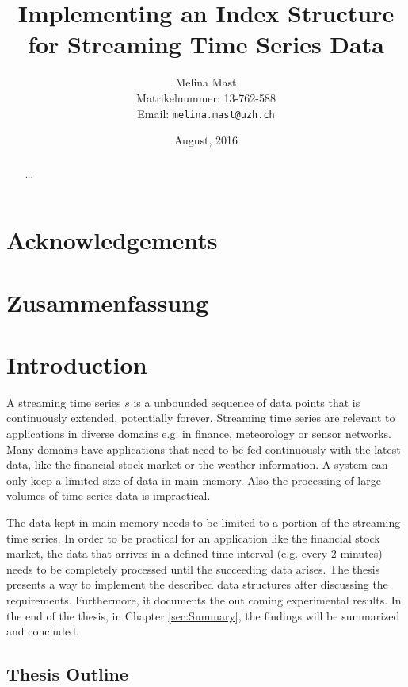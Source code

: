 \documentclass[abstracton,12pt]{scrreprt}
\title{Implementing an Index Structure for Streaming Time Series Data}
\author{
  Melina Mast\\[-5pt]
  \scriptsize Matrikelnummer: 13-762-588\\[-5pt]
  \scriptsize Email: \texttt{melina.mast@uzh.ch}
}
\date{\vspace*{2cm}August, 2016}
\begin{document}
\maketitle

\chapter*{Acknowledgements}



\begin{abstract}
  ...
\end{abstract}

\chapter*{Zusammenfassung}

\tableofcontents
\listoffigures
\listoftables
\listofalgorithms
\renewcommand{\lstlistingname}{Algorithm}%



\chapter{Introduction}
A streaming time series $s$ is a unbounded sequence of data points that is continuously extended, potentially forever. Streaming time series are relevant to applications in diverse domains e.g. in finance, meteorology or sensor networks. Many domains have applications that need to be fed continuously with the latest data, like the financial stock market or the weather information. A system can only keep a limited size of data in main memory. Also the processing of large volumes of time series data is impractical.

The data kept in main memory needs to be limited to a portion of the streaming time series. In order to be practical for an application like the financial stock market, the data that arrives in a defined time interval (e.g. every 2 minutes) needs to be completely processed until the succeeding data arises.
The thesis presents a way to implement the described data structures after discussing the requirements. Furthermore, it documents the out coming experimental results.
In the end of the thesis, in Chapter \ref{sec:Summary}, the findings will be summarized and concluded.

\section{Thesis Outline}
\end{document}
